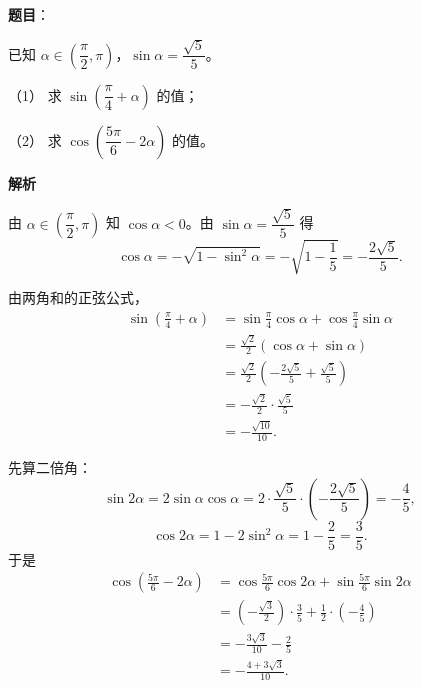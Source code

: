\begin{answer}

\textbf{题目}：

已知 $\alpha\in\left(\dfrac\pi2,\pi\right)$，$\sin\alpha=\dfrac{\sqrt5}{5}$。

（1） 求 $\sin\left(\dfrac\pi4+\alpha\right)$ 的值；

（2） 求 $\cos\left(\dfrac{5\pi}6-2\alpha\right)$ 的值。

\textbf{解析}

由 $\alpha\in\left(\dfrac\pi2,\pi\right)$ 知 $\cos\alpha<0$。由 $\sin\alpha=\dfrac{\sqrt5}5$ 得
\nopagebreak[4]
\[\cos\alpha=-\sqrt{1-\sin^2\alpha}=-\sqrt{1-\frac15}=-\frac{2\sqrt5}5.\]


由两角和的正弦公式，
\nopagebreak[4]
\[\begin{aligned}
\sin\left(\frac\pi4+\alpha\right)
&=\sin\frac\pi4\cos\alpha+\cos\frac\pi4\sin\alpha\\
&=\frac{\sqrt2}2\left(\cos\alpha+\sin\alpha\right)\\
&=\frac{\sqrt2}2\left(-\frac{2\sqrt5}5+\frac{\sqrt5}5\right)\\
&=-\frac{\sqrt2}2\cdot\frac{\sqrt5}5\\
&=-\frac{\sqrt{10}}{10}.
\end{aligned}\]


先算二倍角：
\nopagebreak[4]
\[\sin2\alpha=2\sin\alpha\cos\alpha=2\cdot\frac{\sqrt5}5\cdot\left(-\frac{2\sqrt5}5\right)=-\frac45,\]
\nopagebreak[4]
\[\cos2\alpha=1-2\sin^2\alpha=1-\frac25=\frac35.\]
于是
\nopagebreak[4]
\[\begin{aligned}
\cos\left(\frac{5\pi}6-2\alpha\right)
&=\cos\frac{5\pi}6\cos2\alpha+\sin\frac{5\pi}6\sin2\alpha\\
&=\left(-\frac{\sqrt3}2\right)\cdot\frac35+\frac12\cdot\left(-\frac45\right)\\
&=-\frac{3\sqrt3}{10}-\frac25\\
&=-\frac{4+3\sqrt3}{10}.
\end{aligned}\]



\end{answer}
